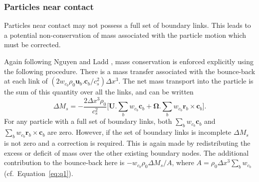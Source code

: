 \subsubsection{Particles near contact}

Particles near contact may not possess a full set of boundary
links. This leads to a potential
non-conservation of mass associated with the particle motion
which must be corrected.

Again following Nguyen and Ladd \cite{nguyen-ladd2002}, mass conservation is
enforced explicitly using the following procedure. There is a mass
transfer associated with the bounce-back at each link of
$(2w_{c_b}\rho_0 \mathbf{u}_b . \mathbf{c}_b / c_s^2) \Delta x^3$.
The net mass transport into the particle is the sum of this
quantity over all the links, and can be written
\begin{equation}
\Delta M_s = - \frac{2\Delta x^3 \rho_0}{c_s^2}
\Big[ \mathbf{U}.\sum_b w_{c_b} \mathbf{c}_b +
  \mathbf{\Omega} . \sum_b w_{c_b} \mathbf{r}_b \times \mathbf{c}_b \Big].
\end{equation}
For any particle with a full set of boundary links, both
$\sum_b w_{c_b} \mathbf{c}_b$
and $\sum_b w_{c_b} \mathbf{r}_b \times \mathbf{c}_b$ are zero.
However, if the set of boundary links is incomplete
$\Delta M_s$ is not zero and
a correction is required. This is again made by redistributing the
excess or deficit of mass over the other existing boundary nodes.
The additional contribution to the bounce-back here is
$-w_{c_b} \rho_0 \Delta M_s/A$, where
$A = \rho_0 \Delta x^3 \sum_b w_{c_b}$ (cf.\ Equation~\ref{eq:q1}).

